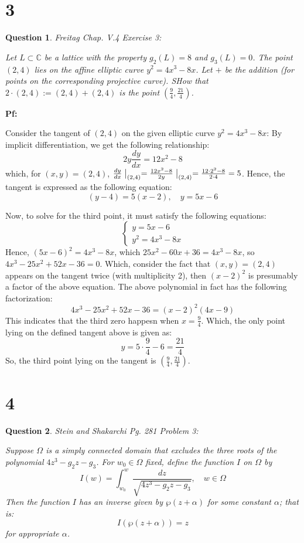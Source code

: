 \documentclass{article}
\newtheorem{question}{Question}
\begin{document}
\break

\section*{3}
\begin{myBox}[]{}
    \begin{question}
        Freitag Chap. V.4 Exercise 3:

        Let $L\subset \mathbb{C}$ be a lattice with the property $g_2(L)=8$ and $g_3(L)=0$. The point $(2,4)$ lies on the affine elliptic curve $y^2=4x^3-8x$.
        Let $+$ be the addition (for points on the corresponding projective curve). SHow that $2\cdot (2,4):= (2,4)+(2,4)$ is the point $(\frac{9}{4},\frac{21}{4})$.
    \end{question}
\end{myBox}

\textbf{Pf:}

Consider the tangent of $(2,4)$ on the given elliptic curve $y^2=4x^3-8x$: By implicit differentiation, we get the following relationship:
$$2y\frac{dy}{dx}=12x^2-8$$
which, for $(x,y)=(2,4)$, $\frac{dy}{dx}\bigm|_{(2,4)}=\frac{12x^2-8}{2y}\bigm|_{(2,4)} = \frac{12\cdot 2^2-8}{2\cdot 4} = 5$. Hence, the tangent is expressed as the following equation:
$$(y-4)=5(x-2),\quad y=5x-6$$

\hfil

Now, to solve for the third point, it must satisfy the following equations:
$$\begin{cases}
    y=5x-6\\
    y^2=4x^3-8x
\end{cases}$$
Hence, $(5x-6)^2 = 4x^3-8x$, which $25x^2-60x+36 = 4x^3-8x$, so $4x^3-25x^2+52x-36 = 0$. Which, consider the fact that $(x,y)=(2,4)$ appears on the tangent twice (with multiplicity 2),
then $(x-2)^2$ is presumably a factor of the above equation. The above polynomial in fact has the following factorization:
$$4x^3-25x^2+52x-36 = (x-2)^2(4x-9)$$
This indicates that the third zero happesn when $x=\frac{9}{4}$. Which, the only point lying on the defined tangent above is given as:
$$y=5\cdot\frac{9}{4}-6 = \frac{21}{4}$$
So, the third point lying on the tangent is $(\frac{9}{4},\frac{21}{4})$.


\break

\section*{4}
\begin{myBox}[]{}
    \begin{question}
        Stein and Shakarchi Pg. 281 Problem 3:

        Suppose $\Omega$ is a simply connected domain that excludes the three roots of the polynomial $4z^3-g_2z-g_3$.
        For $w_0\in\Omega$ fixed, define the function $I$ on $\Omega$ by 
        $$I(w)=\int_{w_0}^{w}\frac{dz}{\sqrt{4z^3-g_2z-g_3}},\quad w\in\Omega$$
        Then the function $I$ has an inverse given by $\wp(z+\alpha)$ for some constant $\alpha$; that is:
        $$I(\wp(z+\alpha))=z$$
        for appropriate $\alpha$.
    \end{question}
\end{myBox}
\end{document}
